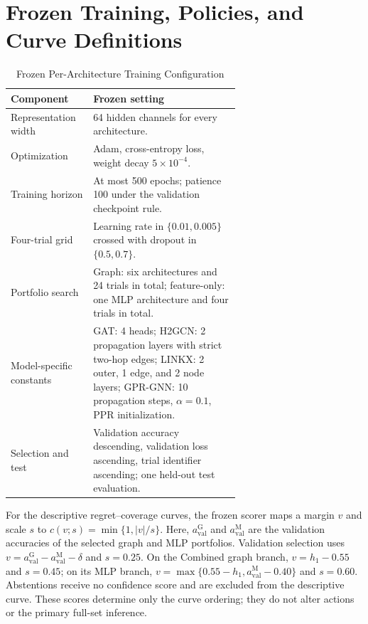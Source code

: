 \section{Frozen Training, Policies, and Curve Definitions}
\label{app:frozen_policy_details}
\begin{table}[htbp]
\centering
\caption{Frozen Per-Architecture Training Configuration}
\label{tab:frozen_training}
\small
\begin{tabular}{@{}lp{0.64\linewidth}@{}}
\toprule
Component & Frozen setting \\
\midrule
Representation width & 64 hidden channels for every architecture. \\
Optimization & Adam, cross-entropy loss, weight decay $5\times 10^{-4}$. \\
Training horizon & At most 500 epochs; patience 100 under the validation checkpoint rule. \\
Four-trial grid & Learning rate in $\{0.01,0.005\}$ crossed with dropout in $\{0.5,0.7\}$. \\
Portfolio search & Graph: six architectures and 24 trials in total; feature-only: one MLP architecture and four trials in total. \\
Model-specific constants & GAT: 4 heads; H2GCN: 2 propagation layers with strict two-hop edges; LINKX: 2 outer, 1 edge, and 2 node layers; GPR-GNN: 10 propagation steps, $\alpha=0.1$, PPR initialization. \\
Selection and test & Validation accuracy descending, validation loss ascending, trial identifier ascending; one held-out test evaluation. \\
\bottomrule
\end{tabular}
\end{table}
For the descriptive regret--coverage curves, the frozen scorer maps a margin $v$ and scale $s$ to $c(v;s)=\min\{1,|v|/s\}$. Here, $a_{\mathrm{val}}^{\mathrm{G}}$ and $a_{\mathrm{val}}^{\mathrm{M}}$ are the validation accuracies of the selected graph and MLP portfolios. Validation selection uses $v=a_{\mathrm{val}}^{\mathrm{G}}-a_{\mathrm{val}}^{\mathrm{M}}-\delta$ and $s=0.25$. On the Combined graph branch, $v=h_1-0.55$ and $s=0.45$; on its MLP branch, $v=\max\{0.55-h_1,a_{\mathrm{val}}^{\mathrm{M}}-0.40\}$ and $s=0.60$. Abstentions receive no confidence score and are excluded from the descriptive curve. These scores determine only the curve ordering; they do not alter actions or the primary full-set inference.

